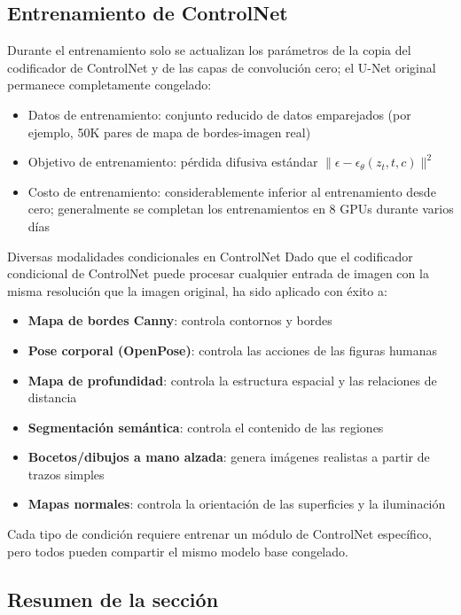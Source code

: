\documentclass[a4paper]{article}
\begin{document}
\subsection{Entrenamiento de ControlNet}

Durante el entrenamiento solo se actualizan los parámetros de la copia del codificador de ControlNet y de las capas de convolución cero; el U-Net original permanece completamente congelado:

\begin{itemize}
    \item Datos de entrenamiento: conjunto reducido de datos emparejados (por ejemplo, 50K pares de mapa de bordes-imagen real)
    \item Objetivo de entrenamiento: pérdida difusiva estándar $\|\epsilon - \epsilon_\theta(z_t, t, c)\|^2$
    \item Costo de entrenamiento: considerablemente inferior al entrenamiento desde cero; generalmente se completan los entrenamientos en 8 GPUs durante varios días
\end{itemize}

\begin{knowledgebox}{Diversas modalidades condicionales en ControlNet}
Dado que el codificador condicional de ControlNet puede procesar cualquier entrada de imagen con la misma resolución que la imagen original, ha sido aplicado con éxito a:
\begin{itemize}
    \item \textbf{Mapa de bordes Canny}: controla contornos y bordes
    \item \textbf{Pose corporal (OpenPose)}: controla las acciones de las figuras humanas
    \item \textbf{Mapa de profundidad}: controla la estructura espacial y las relaciones de distancia
    \item \textbf{Segmentación semántica}: controla el contenido de las regiones
    \item \textbf{Bocetos/dibujos a mano alzada}: genera imágenes realistas a partir de trazos simples
    \item \textbf{Mapas normales}: controla la orientación de las superficies y la iluminación
\end{itemize}
Cada tipo de condición requiere entrenar un módulo de ControlNet específico, pero todos pueden compartir el mismo modelo base congelado.
\end{knowledgebox}

\subsection{Resumen de la sección}
\end{document}
